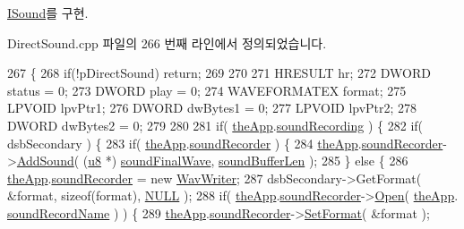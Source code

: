 \mbox{\hyperlink{class_i_sound_ad7913f5fa003c06e8e1a930f760d20e2}{I\+Sound}}를 구현.



Direct\+Sound.\+cpp 파일의 266 번째 라인에서 정의되었습니다.


\begin{DoxyCode}
267 \{
268     \textcolor{keywordflow}{if}(!pDirectSound) \textcolor{keywordflow}{return};
269 
270 
271     HRESULT      hr;
272     DWORD        status = 0;
273     DWORD        play = 0;
274     WAVEFORMATEX format;
275     LPVOID       lpvPtr1;
276     DWORD        dwBytes1 = 0;
277     LPVOID       lpvPtr2;
278     DWORD        dwBytes2 = 0;
279 
280 
281     \textcolor{keywordflow}{if}( \mbox{\hyperlink{_v_b_a_8cpp_a8095a9d06b37a7efe3723f3218ad8fb3}{theApp}}.\mbox{\hyperlink{class_v_b_a_ae4be99a1a898dc5a3fceed0edeb0c1b0}{soundRecording}} ) \{
282         \textcolor{keywordflow}{if}( dsbSecondary ) \{
283             \textcolor{keywordflow}{if}( \mbox{\hyperlink{_v_b_a_8cpp_a8095a9d06b37a7efe3723f3218ad8fb3}{theApp}}.\mbox{\hyperlink{class_v_b_a_ae263135c638f224f26d2f2bfbd069840}{soundRecorder}} ) \{
284                 \mbox{\hyperlink{_v_b_a_8cpp_a8095a9d06b37a7efe3723f3218ad8fb3}{theApp}}.\mbox{\hyperlink{class_v_b_a_ae263135c638f224f26d2f2bfbd069840}{soundRecorder}}->\mbox{\hyperlink{class_wav_writer_a2033f614c70ac3e59d07fb43ea26577a}{AddSound}}( (\mbox{\hyperlink{_system_8h_aed742c436da53c1080638ce6ef7d13de}{u8}} *)
      \mbox{\hyperlink{gb_sound_8cpp_aaaeebaacfff2cb98c4e68a6f89c1c8fc}{soundFinalWave}}, \mbox{\hyperlink{gb_sound_8cpp_aae9aa4cd368679872bfcb1d851f33019}{soundBufferLen}} );
285             \} \textcolor{keywordflow}{else} \{
286                 \mbox{\hyperlink{_v_b_a_8cpp_a8095a9d06b37a7efe3723f3218ad8fb3}{theApp}}.\mbox{\hyperlink{class_v_b_a_ae263135c638f224f26d2f2bfbd069840}{soundRecorder}} = \textcolor{keyword}{new} \mbox{\hyperlink{class_wav_writer}{WavWriter}};
287                 dsbSecondary->GetFormat( &format, \textcolor{keyword}{sizeof}(format), \mbox{\hyperlink{getopt1_8c_a070d2ce7b6bb7e5c05602aa8c308d0c4}{NULL}} );
288                 \textcolor{keywordflow}{if}( \mbox{\hyperlink{_v_b_a_8cpp_a8095a9d06b37a7efe3723f3218ad8fb3}{theApp}}.\mbox{\hyperlink{class_v_b_a_ae263135c638f224f26d2f2bfbd069840}{soundRecorder}}->\mbox{\hyperlink{class_wav_writer_a18a057d0c1901caa6b08f528bd6908a7}{Open}}( \mbox{\hyperlink{_v_b_a_8cpp_a8095a9d06b37a7efe3723f3218ad8fb3}{theApp}}.
      \mbox{\hyperlink{class_v_b_a_a11f02b69eef7e9b876a2f93d6c2f015e}{soundRecordName}} ) ) \{
289                     \mbox{\hyperlink{_v_b_a_8cpp_a8095a9d06b37a7efe3723f3218ad8fb3}{theApp}}.\mbox{\hyperlink{class_v_b_a_ae263135c638f224f26d2f2bfbd069840}{soundRecorder}}->\mbox{\hyperlink{class_wav_writer_a04fe7187eebeff2831af0bc85470744d}{SetFormat}}( &format );

\end{DoxyCode}
